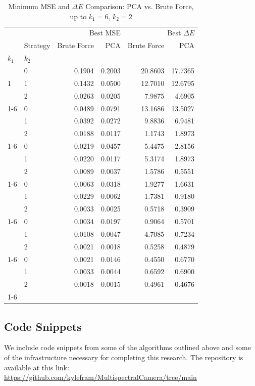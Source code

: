 \begin{table}[htbp]
    \centering
    \begin{tabular}{llrrrr}
    \toprule
     &  & \multicolumn{2}{r}{Best MSE} & \multicolumn{2}{r}{Best $\Delta E$} \\
     & Strategy & Brute Force & PCA & Brute Force & PCA \\
    $k_1$ & $k_2$ &  &  &  &  \\
    \midrule
    \multirow[t]{3}{*}{1} & 0 & 0.1904 & 0.2003 & 20.8603 & 17.7365 \\
      & 1 & 0.1432 & 0.0500 & 12.7010 & 12.6795 \\
      & 2 & 0.0263 & 0.0205 & 7.9875 & 4.6905 \\
    \cline{1-6}
    \multirow[t]{3}{*}{2} & 0 & 0.0489 & 0.0791 & 13.1686 & 13.5027 \\
      & 1 & 0.0392 & 0.0272 & 9.8836 & 6.9481 \\
      & 2 & 0.0188 & 0.0117 & 1.1743 & 1.8973 \\
    \cline{1-6}
    \multirow[t]{3}{*}{3} & 0 & 0.0219 & 0.0457 & 5.4475 & 2.8156 \\
      & 1 & 0.0220 & 0.0117 & 5.3174 & 1.8973 \\
      & 2 & 0.0089 & 0.0037 & 1.5786 & 0.5551 \\
    \cline{1-6}
    \multirow[t]{3}{*}{4} & 0 & 0.0063 & 0.0318 & 1.9277 & 1.6631 \\
      & 1 & 0.0229 & 0.0062 & 1.7381 & 0.9180 \\
      & 2 & 0.0033 & 0.0025 & 0.5718 & 0.3909 \\
    \cline{1-6}
    \multirow[t]{3}{*}{5} & 0 & 0.0034 & 0.0197 & 0.9064 & 0.5701 \\
      & 1 & 0.0108 & 0.0047 & 4.7085 & 0.7234 \\
      & 2 & 0.0021 & 0.0018 & 0.5258 & 0.4879 \\
    \cline{1-6}
    \multirow[t]{3}{*}{6} & 0 & 0.0021 & 0.0146 & 0.4550 & 0.6770 \\
      & 1 & 0.0033 & 0.0044 & 0.6592 & 0.6900 \\
      & 2 & 0.0018 & 0.0015 & 0.4961 & 0.4676 \\
    \cline{1-6}
    \bottomrule
    \end{tabular}
    \caption{Minimum MSE and $\Delta E$ Comparison: PCA vs. Brute Force, up to $k_1=6$, $k_2=2$}
    \label{tab:mse_deltae_comparison}
\end{table}

\subsection{Code Snippets}
We include code snippets from some of the algorithms outlined above and some of the infrastructure necessary for completing this research. 
The repository is available at this link: \href{https://github.com/kylefram/MultispectralCamera/tree/main}{https://github.com/kylefram/MultispectralCamera/tree/main}

